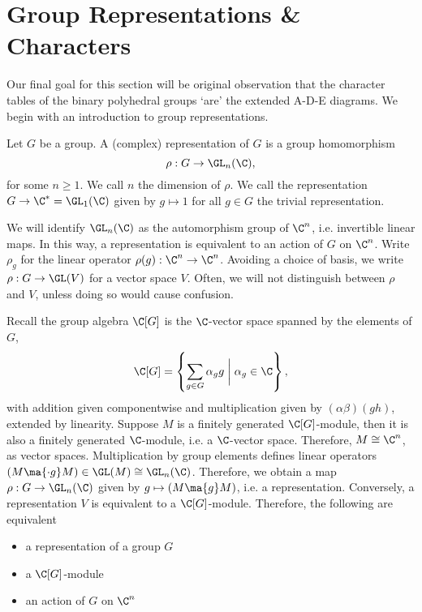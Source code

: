 \newpage
\section{Group Representations \& Characters}

Our final goal for this section will be \mc original observation that the character tables of the binary polyhedral groups `are' the extended A-D-E diagrams. We begin with an introduction to group representations.


\begin{dfn}[Representation]
Let $G$ be a group. A (complex) representation of $G$ is a group homomorphism
	\[
	\rho: G \to \GL_n(\C),
	\]
for some $n \geq 1$. We call $n$ the dimension of $\rho$. We call the representation $G \to \C^*=\GL_1(\C)$ given by $g \mapsto 1$ for all $g \in G$ the trivial representation. 
\end{dfn}


We will identify $\GL_n(\C)$ as the automorphism group of $\C^n$, i.e. invertible linear maps. In this way, a representation is equivalent to an action of $G$ on $\C^n$. Write $\rho_g$ for the linear operator $\rho(g): \C^n \to \C^n$. Avoiding a choice of basis, we write $\rho: G \to \GL(V)$ for a vector space $V$. Often, we will not distinguish between $\rho$ and $V$, unless doing so would cause confusion. 


\begin{rem}
Recall the group algebra $\C[G]$ is the $\C$-vector space spanned by the elements of $G$,
	\[
	\C[G]= \left\{ \sum_{g \in G} \alpha_g g \;\bigg|\; \alpha_g \in \C \right\},
	\]
with addition given componentwise and multiplication given by $(\alpha\beta)(gh)$, extended by linearity. Suppose $M$ is a finitely generated $\C[G]$-module, then it is also a finitely generated $\C$-module, i.e. a $\C$-vector space. Therefore, $M \cong \C^n$, as vector spaces. Multiplication by group elements defines linear operators $(M \ma{\cdot g} M) \in \GL(M)\cong\GL_n(\C)$. Therefore, we obtain a map $\rho: G \to \GL_n(\C)$ given by $g \mapsto (M \ma{g} M)$, i.e. a representation. Conversely, a representation $V$ is equivalent to a $\C[G]$-module. Therefore, the following are equivalent
	\begin{itemize}
	\item a representation of a group $G$
	\item a $\C[G]$-module
	\item an action of $G$ on $\C^n$
	\end{itemize}
\end{rem}


